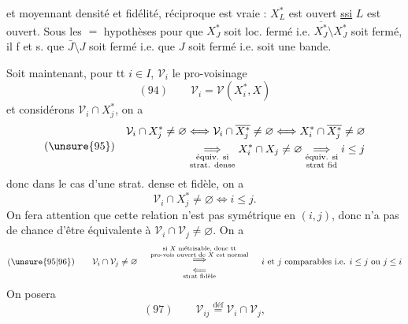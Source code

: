 
et moyennant densité et fidélité,  réciproque est vraie : $X_L^*$ est ouvert \uline{ssi} $L$ est ouvert. Sous les $=$ hypothèses pour que $X_J^*$ soit loc. fermé i.e. $\overline{X_J^*}\setminus X_J^*$  soit fermé,  il f et s. que $\bar J\setminus J$ soit fermé i.e. que $J$ soit  fermé i.e. soit une bande.

Soit maintenant, pour tt $i\in I$, $\mathcal V_i$ le pro-voisinage
\[(94)\qquad\mathcal V_i=\mathcal V(X_i^*,X)\]
et considérons $\mathcal V_i\cap X_j^*$, on a
\[
(\unsure{95})\quad\begin{aligned}
\mathcal V_i\cap X_j^*\neq\varnothing&\Longleftrightarrow\mathcal V_i\cap\overline{X_j^*}\neq\varnothing\Longleftrightarrow X_i^*\cap\overline{X_j^*}\neq\varnothing\\
&\underset{\substack{\text{équiv. si}\\\text{strat. dense}}}{\Longrightarrow}X_i^*\cap X_j\neq\varnothing\underset{\substack{\text{équiv. si}\\\text{strat fid}}}{\Longrightarrow}i\leq j
\end{aligned}
\]
donc dans le cas d'une strat. dense et fidèle,  on a
\[\mathcal V_i\cap X_j^*\neq\varnothing\Longleftrightarrow i\leq j.\]
On fera attention que cette relation n'est pas symétrique en $(i,j)$,  donc n'a pas de chance d'être équivalente à $\mathcal V_i\cap\mathcal V_j\neq\varnothing$. On a
\[
(\unsure{95|96})\qquad\mathcal V_i\cap\mathcal V_j\neq\varnothing\quad
\begin{array}{c}
\overset{\substack{\text{si $X$ métrisable, donc tt}\\\text{pro-vois ouvert de $X$ est normal}}}{\Longrightarrow}\\
\underset{\text{strat fidèle}}{\Longleftarrow}
\end{array}
\quad\text{$i$ et $j$ comparables i.e. $i\leq j$ ou $j\leq i$}
\]
On posera
\[(97)\qquad\mathcal V_{ij}\overset{\mathrm{déf}}=\mathcal V_i\cap\mathcal V_j,\]
